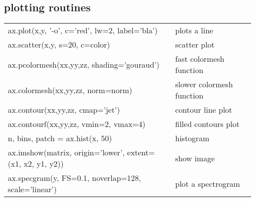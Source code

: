 \documentclass[10pt, a4paper, twocolumn]{article}
\begin{document}
\subsection*{plotting routines}
\begin{tabular}{ p{} p{} }
  ax.plot(x,y, '-o', c='red', lw=2, label='bla') & plots a line\\
  ax.scatter(x,y, s=20, c=color) & scatter plot\\
  ax.pcolormesh(xx,yy,zz, shading='gouraud') & fast colormesh function\\
  ax.colormesh(xx,yy,zz, norm=norm) & slower colormesh function\\
  ax.contour(xx,yy,zz, cmap='jet') & contour line plot\\
  ax.contourf(xx,yy,zz, vmin=2, vmax=4) & filled contours plot\\
  n, bins, patch = ax.hist(x, 50) & histogram\\
  ax.imshow(matrix, origin='lower', extent=(x1, x2, y1, y2)) & show image\\
  ax.specgram(y, FS=0.1, noverlap=128, scale='linear') & plot a spectrogram\\
\end{tabular}
\end{document}
